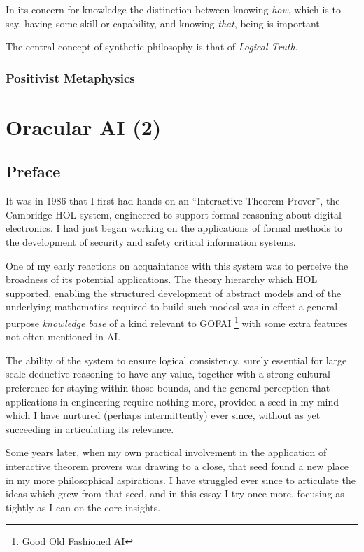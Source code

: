 \documentclass[10pt,titlepage]{book}
\begin{document}
In its concern for knowledge the distinction between knowing \emph{how}, which is to say, having some skill or capability, and knowing \emph{that}, being  is important

The central concept of synthetic philosophy is that of \emph{Logical Truth}.

\subsection{Positivist Metaphysics}




\chapter{Oracular AI (2)}

\section*{Preface}

It was in 1986 that I first had hands on an ``Interactive Theorem Prover'', the Cambridge HOL system,
engineered to support formal reasoning about digital electronics.
I had just began working on the applications of formal methods to the development of security and safety critical information systems.

One of my early reactions on acquaintance with this system was to perceive the broadness of its potential applications.
The theory hierarchy which HOL supported, enabling the structured development of abstract models and of  the underlying mathematics required to build such modesl was in effect a general purpose \emph{knowledge base} of a kind relevant to GOFAI \footnote{Good Old Fashioned AI} with some extra features not often mentioned in AI.

The ability of the system to ensure logical consistency, surely essential for large scale deductive reasoning to have any value, together with a strong cultural preference for staying within those bounds, and the general perception that applications in engineering require nothing more, provided a seed in my mind which I have nurtured (perhaps intermittently) ever since, without as yet succeeding in articulating its relevance.

Some years later, when my own practical involvement in the application of interactive theorem provers was drawing to a close, that seed found a new place in my more philosophical aspirations.
I have struggled ever since to articulate the ideas which grew from that seed, and in this essay I try once more, focusing as tightly as I can on the core insights.
\end{document}
